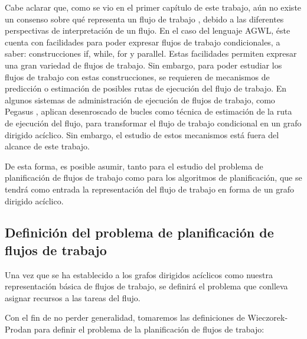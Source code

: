 Cabe aclarar que, como se vio en el primer capítulo de este trabajo, aún no existe un consenso sobre qué representa un flujo de trabajo \cite{van2003workflow}, debido a las diferentes perspectivas de interpretación de un flujo. En el caso del lenguaje AGWL, éste cuenta con facilidades para poder expresar flujos de trabajo condicionales, a saber: construcciones if, while, for y parallel. Estas facilidades permiten expresar una gran variedad de flujos de trabajo. Sin embargo, para poder estudiar los flujos de trabajo con estas construcciones, se requieren de mecanismos de predicción o estimación de posibles rutas de ejecución del flujo de trabajo. En algunos sistemas de administración de ejecución de flujos de trabajo, como Pegasus \cite{deelman2005pegasus}, aplican desenroscado de bucles como técnica de estimación de la ruta de ejecución del flujo, para transformar el flujo de trabajo condicional en un grafo dirigido acíclico. Sin embargo, el estudio de estos mecanismos está fuera del alcance de este trabajo.



De esta forma, es posible asumir, tanto para el estudio del problema de planificación de flujos de trabajo como para los algoritmos de planificación, que se tendrá como entrada la representación del flujo de trabajo en forma de un grafo dirigido acíclico.

\subsection{Definición del problema de planificación de flujos de trabajo}
Una vez que se ha establecido a los grafos dirigidos acíclicos como nuestra representación básica de flujos de trabajo, se definirá el problema que conlleva asignar recursos a las tareas del flujo.

Con el fin de no perder generalidad, tomaremos las definiciones de Wieczorek-Prodan \cite{wieczorek2008taxonomies} para definir el problema de la planificación de flujos de trabajo:

